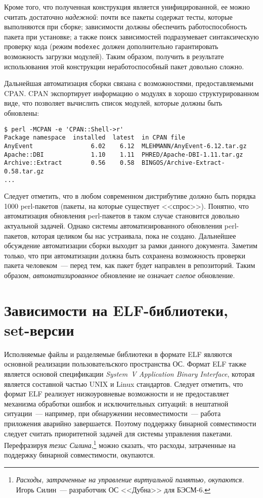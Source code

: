 \documentclass[russian,a4paper,12pt,titlepage]{article}
\begin{document}
Кроме того, что полученная конструкция является унифицированной, ее можно считать достаточно \emph{надежной}:
почти все пакеты содержат тесты, которые выполняются при сборке; зависимости должны обеспечить
работоспособность пакета при установке; а также поиск зависимостей подразумевает синтаксическую проверку кода
(режим \verb|modexec| должен дополнительно гарантировать возможность загрузки модулей).
Таким образом, получить в результате использования этой конструкции неработоспособный пакет довольно сложно.

Дальнейшая автоматизация сборки связана с возможностями, предоставляемыми CPAN.
CPAN экспортирует информацию о модулях в хорошо структурированном виде, что позволяет
вычислить список модулей, которые должны быть обновлены:
\begin{verbatim}
$ perl -MCPAN -e 'CPAN::Shell->r'
Package namespace  installed  latest  in CPAN file
AnyEvent                6.02    6.12  MLEHMANN/AnyEvent-6.12.tar.gz
Apache::DBI             1.10    1.11  PHRED/Apache-DBI-1.11.tar.gz
Archive::Extract        0.56    0.58  BINGOS/Archive-Extract-0.58.tar.gz
...
\end{verbatim}

Следует отметить, что в любом современном дистрибутиве должно быть порядка 1000 perl-пакетов (пакеты, на которые существует <<спрос>>).
Понятно, что автоматизация обновления perl-пакетов в таком случае становится довольно актуальной задачей.  Однако системы
автоматизированного обновления perl-пакетов, которая целиком бы нас устраивала, пока не создано.
Дальнейшее обсуждение автоматизации сборки выходит за рамки данного документа.  Заметим только, что при автоматизации
должна быть сохранена возможность проверки пакета человеком~--- перед тем, как пакет будет направлен в репозиторий.
Таким образом, \emph{автоматизированное} обновление не означает \emph{слепое} обновление.

\section{Зависимости на ELF-библиотеки, set-версии}
Исполняемые файлы и разделяемые библиотеки в формате ELF являются основной реализации пользовательского пространства ОС.
Формат ELF также является основой спецификации \textsl{System~V Application Binary Interface}, которая является составной частью
UNIX и Linux стандартов.  Следует отметить, что формат ELF реализует низкоуровневые возможности и не предоставляет механизма
обработки ошибок и исключительных ситуаций: в нештатной ситуации~--- например, при обнаружении несовместимости~--- работа
приложения аварийно завершается.  Поэтому поддержку бинарной совместимости следует считать приоритетной задачей для системы
управления пакетами.  Перефразируя
\emph{тезис Силина},\footnote{\textit{Расходы, затраченные на управление виртуальной памятью, окупаются.}
Игорь Силин~--- разработчик ОС <<Дубна>> для БЭСМ-6.}
можно сказать, что расходы, затраченные на поддержку бинарной совместимости, окупаются.
\end{document}
